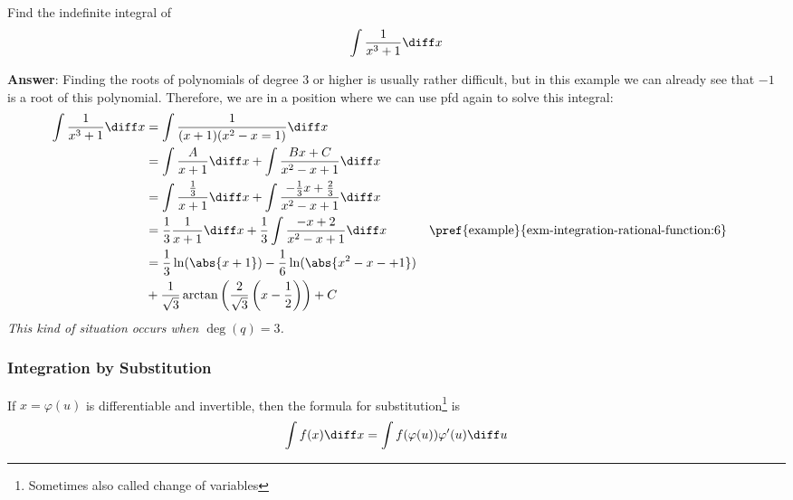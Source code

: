 \begin{exm}\label{exm-integration-rational-function:7}
	Find the indefinite integral of
	\begin{equation*}
		\int \frac{1}{x^3+1} \diff x
	\end{equation*}
	\begin{flushleft}
		\textbf{Answer}: Finding the roots of polynomials of degree $3$ or higher is
		usually rather difficult, but in this example we can already see that $-1$ is
		a root of this polynomial. Therefore, we are in a position where we can use
		\gls{pfd} again to solve this integral:
		\begin{align*}
			\int \frac{1}{x^3+1} \diff x
			 & = \int \frac{1}{(x+1)(x^2-x=1)} \diff x                                                                                                                         \\
			 & = \int \frac{A}{x+1} \diff x + \int \frac{Bx+C}{x^2-x+1} \diff x                                                                                                \\
			 & = \int \frac{\frac{1}{3}}{x+1} \diff x + \int \frac{-\frac{1}{3}x+\frac{2}{3}}{x^2-x+1} \diff x                                                                 \\
			 & = \frac{1}{3} \frac{1}{x+1} \diff x + \frac{1}{3} \int \frac{-x+2}{x^2-x+1} \diff x             &  & \text{\pref{example}{exm-integration-rational-function:6}} \\
			 & = \frac{1}{3}\ln(\abs{x+1}) -\frac{1}{6}\ln(\abs{x^2-x-+1})                                                                                                     \\
			 & + \frac{1}{\sqrt{3}} \arctan\left(\frac{2}{\sqrt{3}}\left(x-\frac{1}{2}\right)\right) + C
		\end{align*}
		\textit{This kind of situation occurs when $\deg(q)=3$.}
	\end{flushleft}
\end{exm}

\subsubsection{Integration by Substitution}\label{subsubsec-integration-by-substitution}

\begin{thm}\label{thm-integration-using-substitution}
	If $x=\varphi(u)$ is differentiable and invertible, then the formula for
	substitution\footnote{Sometimes also called change of variables} is
	\begin{equation}\label{eq-integration-using-substitution}
		\int f(x) \diff x = \int f(\varphi(u))\varphi'(u) \diff u
	\end{equation}
\end{thm}

